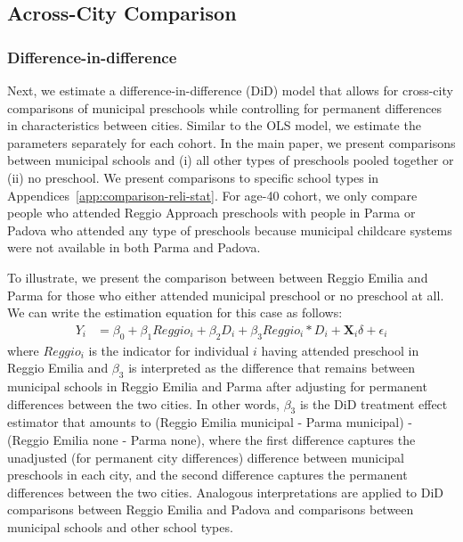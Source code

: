 \subsection{Across-City Comparison} \label{sec:across-city-analysis}
\subsubsection{Difference-in-difference}  \label{subsubsection:DID}
Next, we estimate a difference-in-difference (DiD) model that allows for cross-city comparisons of municipal preschools while controlling for permanent differences in characteristics between cities. Similar to the OLS model, we estimate the parameters separately for each cohort. In the main paper, we present comparisons between municipal schools and (i) all other types of preschools pooled together or (ii) no preschool. We present comparisons to specific school types in Appendices~\ref{app:comparison-reli-stat}. %
For age-40 cohort, we only compare people who attended Reggio Approach preschools with people in Parma or Padova who attended any type of preschools because municipal childcare systems were not available in both Parma and Padova. 

To illustrate, we present the comparison between between Reggio Emilia and Parma for those who either attended municipal preschool or no preschool at all. We can write the estimation equation for this case as follows:
\begin{eqnarray}  \label{eq:specific2}
Y_i & = \beta_0 + \beta_1 Reggio_i + \beta_2 D_i + \beta_3 Reggio_i * D_i + \bm{X}_i\delta + \epsilon_i
\end{eqnarray}
\noindent where $Reggio_i$ is the indicator for individual $i$ having attended preschool in Reggio Emilia and $\beta_3$ is interpreted as the difference that remains between municipal schools in Reggio Emilia and Parma after adjusting for permanent differences between the two cities. In other words, $\beta_3$ is the DiD treatment effect estimator that amounts to (Reggio Emilia municipal - Parma municipal) - (Reggio Emilia none - Parma none), where the first difference captures the unadjusted (for permanent city differences) difference between municipal preschools in each city, and the second difference captures the permanent differences between the two cities. Analogous interpretations are applied to DiD comparisons between Reggio Emilia and Padova and comparisons between municipal schools and other school types.

